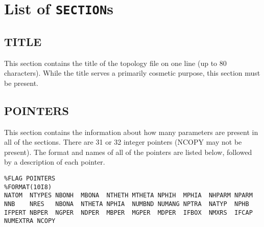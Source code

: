 \section{List of {\tt SECTION}s}

\subsection*{TITLE}

This section contains the title of the topology file on one line (up to 80
characters). While the title serves a primarily cosmetic purpose, this section
must be present.


\subsection*{POINTERS}

This section contains the information about how many parameters are present in
all of the sections. There are 31 or 32 integer pointers (NCOPY may not be
present). The format and names of all of the pointers are listed below, followed
by a description of each pointer.

\vspace{8pt}
\hline
\vspace{4pt}

\begin{verbatim}
%FLAG POINTERS
%FORMAT(10I8)
NATOM  NTYPES NBONH  MBONA  NTHETH MTHETA NPHIH  MPHIA  NHPARM NPARM  
NNB    NRES   NBONA  NTHETA NPHIA  NUMBND NUMANG NPTRA  NATYP  NPHB   
IFPERT NBPER  NGPER  NDPER  MBPER  MGPER  MDPER  IFBOX  NMXRS  IFCAP  
NUMEXTRA NCOPY 
\end{verbatim}

\vspace{4pt}
\hline
\vspace{8pt}

